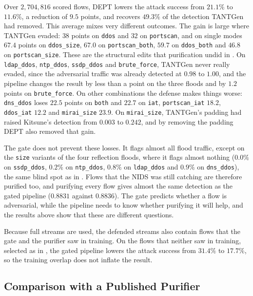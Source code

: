 Over $2{,}704{,}816$ scored flows, DEPT lowers the attack success from $21.1\%$ to
$11.6\%$, a reduction of $9.5$ points, and recovers $49.3\%$ of the detection TANTGen
had removed. This average mixes very different outcomes. The gain is large where
TANTGen evaded: $38$ points on \texttt{ddos} and $32$ on \texttt{portscan}, and on single
modes $67.4$ points on \texttt{ddos\_size}, $67.0$ on \texttt{portscan\_both}, $59.7$ on
\texttt{ddos\_both} and $46.8$ on \texttt{portscan\_size}. These are the structural
edits that purification undid in . On \texttt{ldap\_ddos},
\texttt{ntp\_ddos}, \texttt{ssdp\_ddos} and \texttt{brute\_force}, TANTGen never really
evaded, since the adversarial traffic was already detected at $0.98$ to $1.00$, and the
pipeline changes the result by less than a point on the three floods and by $1.2$ points
on \texttt{brute\_force}. On other combinations the defense makes things worse:
\texttt{dns\_ddos} loses $22.5$ points on \texttt{both} and $22.7$ on \texttt{iat},
\texttt{portscan\_iat} $18.2$, \texttt{ddos\_iat} $12.2$ and \texttt{mirai\_size}
$23.9$. On \texttt{mirai\_size}, TANTGen's padding had raised Kitsune's detection from
$0.003$ to $0.242$, and by removing the padding DEPT also removed that gain.

The gate does not prevent these losses. It flags almost all flood traffic, except on the
\texttt{size} variants of the four reflection floods, where it flags almost nothing
($0.0\%$ on \texttt{ssdp\_ddos}, $0.2\%$ on \texttt{ntp\_ddos}, $0.8\%$ on
\texttt{ldap\_ddos} and $0.9\%$ on \texttt{dns\_ddos}), the same blind spot as in
. Flows that the \ac{NIDS} was still catching are therefore
purified too, and purifying every flow gives almost the same detection as the gated
pipeline ($0.8831$ against $0.8836$). The gate predicts whether a flow is adversarial,
while the pipeline needs to know whether purifying it will help, and the results above
show that these are different questions.

Because full streams are used, the defended streams also contain flows that the gate
and the purifier saw in training. On the flows that neither saw in training, selected as
in , the gated pipeline lowers the attack success from $31.4\%$
to $17.7\%$, so the training overlap does not inflate the result.

\subsection{Comparison with a Published Purifier}\label{subsec:eval-sota}

